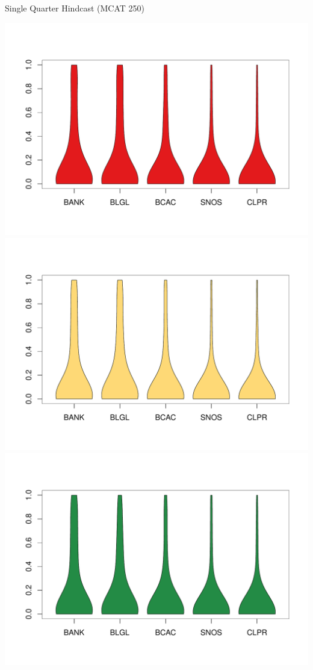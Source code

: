\documentclass[ xcolor = pdftex, dvipsnames, table ]{beamer}
\begin{document}
\begin{frame}{Single Quarter Hindcast (MCAT 250)}
\begin{minipage}{0.29\textwidth}
\includegraphics[height=0.36\textheight]{../pictures/vioOSBNET.pdf}\\
\vspace*{-1.3cm}
\includegraphics[height=0.36\textheight]{../pictures/vioOLANET.pdf}\\
\vspace*{-1.3cm}
\includegraphics[height=0.36\textheight]{../pictures/vioOSDNET.pdf}

\end{minipage}
\end{frame}
\end{document}
